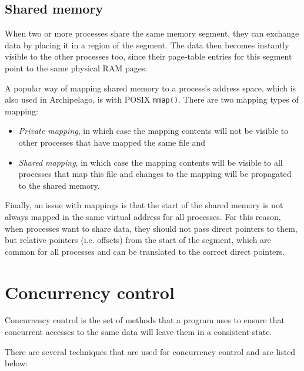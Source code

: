 \subsection{Shared memory}

When two or more processes share the same memory segment, they can exchange 
data by placing it in a region of the segment. The data then becomes instantly 
visible to the other processes too, since their page-table entries for this 
segment point to the same physical RAM pages.

A popular way of mapping shared memory to a process's address space, which is 
also used in Archipelago, is with POSIX \texttt{mmap()}. There are two mapping 
types of mapping:

\begin{itemize}
	\item \textit{Private mapping}, in which case the mapping contents will 
		not be visible to other processes that have mapped the same 
		file and
	\item \textit{Shared mapping}, in which case the mapping contents will 
		be visible to all processes that map this file and changes to 
		the mapping will be propagated to the shared memory.
\end{itemize}

Finally, an issue with mappings is that the start of the shared memory is not 
always mapped in the same virtual address for all processes. For this reason, 
when processes want to share data, they should not pass direct pointers to 
them, but relative pointers (i.e. offsets) from the start of the segment, which 
are common for all processes and can be translated to the correct direct 
pointers.

\section{Concurrency control\label{sec:conc-theory}}

Concurrency control is the set of methods that a program uses to ensure that 
concurrent accesses to the same data will leave them in a consistent state.

There are several techniques that are used for concurrency control and are 
listed below:

